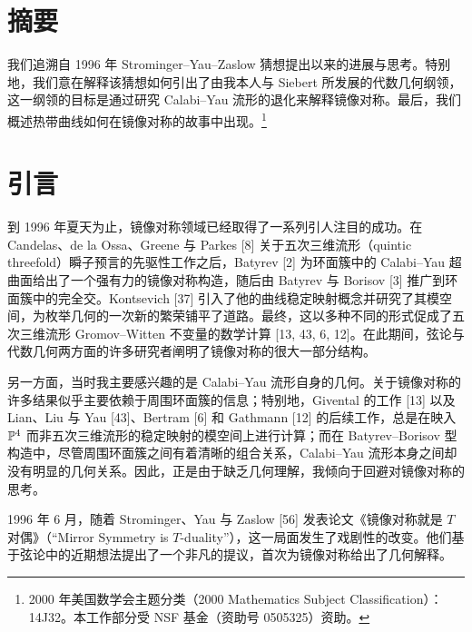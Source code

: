 \section*{摘要}

我们追溯自 1996 年 Strominger--Yau--Zaslow 猜想提出以来的进展与思考。特别地，我们意在解释该猜想如何引出了由我本人与 Siebert 所发展的代数几何纲领，这一纲领的目标是通过研究 Calabi--Yau 流形的退化来解释镜像对称。最后，我们概述热带曲线如何在镜像对称的故事中出现。\footnote{2000 年美国数学会主题分类（2000 Mathematics Subject Classification）：14J32。本工作部分受 NSF 基金（资助号 0505325）资助。}



\section*{引言}

到 1996 年夏天为止，镜像对称领域已经取得了一系列引人注目的成功。在 Candelas、de la Ossa、Greene 与 Parkes [8] 关于五次三维流形（quintic threefold）瞬子预言的先驱性工作之后，Batyrev [2] 为环面簇中的 Calabi--Yau 超曲面给出了一个强有力的镜像对称构造，随后由 Batyrev 与 Borisov [3] 推广到环面簇中的完全交。Kontsevich [37] 引入了他的曲线稳定映射概念并研究了其模空间，为枚举几何的一次新的繁荣铺平了道路。最终，这以多种不同的形式促成了五次三维流形 Gromov--Witten 不变量的数学计算 [13, 43, 6, 12]。在此期间，弦论与代数几何两方面的许多研究者阐明了镜像对称的很大一部分结构。

另一方面，当时我主要感兴趣的是 Calabi--Yau 流形自身的几何。关于镜像对称的许多结果似乎主要依赖于周围环面簇的信息；特别地，Givental 的工作 [13] 以及 Lian、Liu 与 Yau [43]、Bertram [6] 和 Gathmann [12] 的后续工作，总是在映入 $\mathbb{P}^4$ 而非五次三维流形的稳定映射的模空间上进行计算；而在 Batyrev--Borisov 型构造中，尽管周围环面簇之间有着清晰的组合关系，Calabi--Yau 流形本身之间却没有明显的几何关系。因此，正是由于缺乏几何理解，我倾向于回避对镜像对称的思考。

1996 年 6 月，随着 Strominger、Yau 与 Zaslow [56] 发表论文《镜像对称就是 $T$ 对偶》（``Mirror Symmetry is $T$-duality''），这一局面发生了戏剧性的改变。他们基于弦论中的近期想法提出了一个非凡的提议，首次为镜像对称给出了几何解释。

